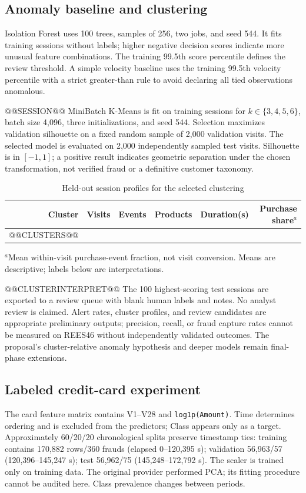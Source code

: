 \documentclass[conference]{IEEEtran}
\newcommand{\code}[1]{\texttt{\small #1}}
\begin{document}
\subsection{Anomaly baseline and clustering}
Isolation Forest uses 100 trees, samples of 256, two jobs, and seed 544. It fits training sessions without labels; higher negative decision scores indicate more unusual feature combinations. The training 99.5th score percentile defines the review threshold. A simple velocity baseline uses the training 99.5th velocity percentile with a strict greater-than rule to avoid declaring all tied observations anomalous.

@@SESSION@@
MiniBatch K-Means is fit on training sessions for $k\in\{3,4,5,6\}$, batch size 4,096, three initializations, and seed 544. Selection maximizes validation silhouette on a fixed random sample of 2,000 validation visits. The selected model is evaluated on 2,000 independently sampled test visits. Silhouette is in $[-1,1]$; a positive result indicates geometric separation under the chosen transformation, not verified fraud or a definitive customer taxonomy.

\begin{table}[t]\centering\caption{Held-out session profiles for the selected clustering}\label{tab:clusters}\scriptsize
\begin{tabular}{rrrrrr}\toprule Cluster & Visits & Events & Products & Duration(s) & Purchase share$^a$\\\midrule
@@CLUSTERS@@
\bottomrule\end{tabular}\begin{flushleft}\scriptsize $^a$Mean within-visit purchase-event fraction, not visit conversion. Means are descriptive; labels below are interpretations.\end{flushleft}\end{table}
@@CLUSTERINTERPRET@@
The 100 highest-scoring test sessions are exported to a review queue with blank human labels and notes. No analyst review is claimed. Alert rates, cluster profiles, and review candidates are appropriate preliminary outputs; precision, recall, or fraud capture rates cannot be measured on REES46 without independently validated outcomes. The proposal's cluster-relative anomaly hypothesis and deeper models remain final-phase extensions.

\subsection{Labeled credit-card experiment}
The card feature matrix contains V1--V28 and \code{log1p(Amount)}. Time determines ordering and is excluded from the predictors; Class appears only as a target. Approximately 60/20/20 chronological splits preserve timestamp ties: training contains 170,882 rows/360 frauds (elapsed 0--120,395 s); validation 56,963/57 (120,396--145,247 s); test 56,962/75 (145,248--172,792 s). The scaler is trained only on training data. The original provider performed PCA; its fitting procedure cannot be audited here. Class prevalence changes between periods.
\end{document}
